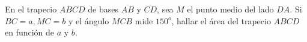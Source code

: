 En el trapecio $ABCD$ de bases $\overline{AB}$ y $\overline{CD}$, sea $M$ el punto medio del lado $DA$. Si $BC=a,MC=b$ y el ángulo $MCB$ mide $150^o$, hallar el área del trapecio $ABCD$ en función de $a$ y $b$.
